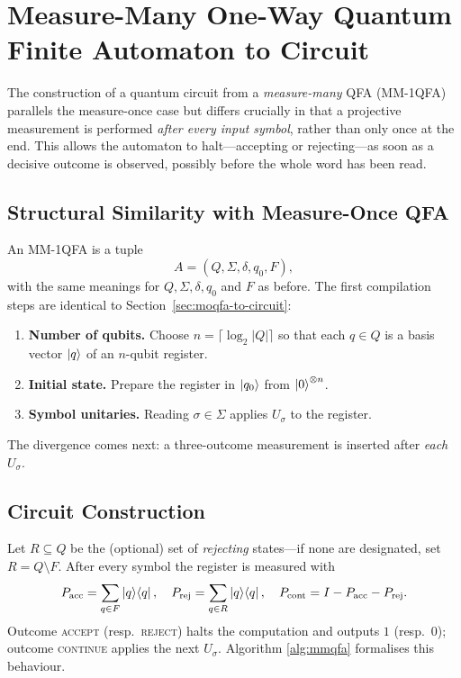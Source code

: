 \section{Measure-Many One-Way Quantum Finite Automaton to Circuit}
\label{sec:mmqfa-to-circuit}

The construction of a quantum circuit from a \emph{measure-many}
QFA (MM-1QFA) parallels the measure-once case but differs
crucially in that a projective measurement is performed
\emph{after every input symbol}, rather than only once at the end.
This allows the automaton to halt---accepting or rejecting---as
soon as a decisive outcome is observed, possibly before the whole
word has been read.

\subsection{Structural Similarity with Measure-Once QFA}

An MM-1QFA is a tuple
\[
  A=(Q,\Sigma,\delta,q_0,F),
\]
with the same meanings for $Q,\Sigma,\delta,q_0$ and $F$ as before.
The first compilation steps are identical to
Section~\ref{sec:moqfa-to-circuit}:

\begin{enumerate}[leftmargin=*,label=\textbf{\arabic*.}]
\item \textbf{Number of qubits.}
      Choose $n=\lceil\log_2|Q|\rceil$ so that each
      $q\in Q$ is a basis vector $\ket{q}$ of an $n$-qubit register.
\item \textbf{Initial state.}
      Prepare the register in $\ket{q_0}$ from $\ket{0}^{\otimes n}$.
\item \textbf{Symbol unitaries.}
      Reading $\sigma\in\Sigma$ applies $U_\sigma$ to the register.
\end{enumerate}

\noindent
The divergence comes next: a three-outcome measurement is inserted
after \emph{each} $U_\sigma$.

\subsection{Circuit Construction}

Let $R\subseteq Q$ be the (optional) set of \emph{rejecting}
states---if none are designated, set $R=Q\setminus F$.
After every symbol the register is measured with
\[
  P_{\text{acc}}=\sum_{q\in F}\ket{q}\!\bra{q},
  \quad
  P_{\text{rej}}=\sum_{q\in R}\ket{q}\!\bra{q},
  \quad
  P_{\text{cont}}=I-P_{\text{acc}}-P_{\text{rej}}.
\]
Outcome \textsc{accept} (resp.\ \textsc{reject})
halts the computation and outputs $1$ (resp.\ $0$);
outcome \textsc{continue} applies the next $U_\sigma$.
Algorithm \ref{alg:mmqfa} formalises this behaviour.


